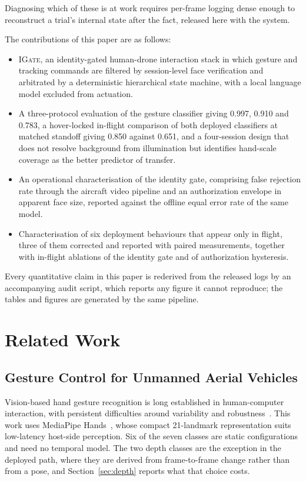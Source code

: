 \documentclass[conference]{IEEEtran}
\newcommand{\method}[1]{\textsc{#1}}
\begin{document}
Diagnosing which of these is at work requires per-frame logging dense enough to
reconstruct a trial's internal state after the fact, released here with the
system.

The contributions of this paper are as follows:

\begin{itemize}
\item \method{IGate}, an identity-gated human-drone interaction stack in which
      gesture and tracking commands are filtered by session-level face
      verification and arbitrated by a deterministic hierarchical state machine,
      with a local language model excluded from actuation.
\item A three-protocol evaluation of the gesture classifier giving 0.997, 0.910
      and 0.783, a hover-locked in-flight comparison of both deployed
      classifiers at matched standoff giving 0.850 against 0.651, and a
      four-session design that does not resolve background from illumination but
      identifies hand-scale coverage as the better predictor of transfer.
\item An operational characterisation of the identity gate, comprising false
      rejection rate through the aircraft video pipeline and an authorization
      envelope in apparent face size, reported against the offline equal error
      rate of the same model.
\item Characterisation of six deployment behaviours that appear only in flight,
      three of them corrected and reported with paired measurements, together with
      in-flight ablations of the identity gate and of authorization hysteresis.
\end{itemize}

Every quantitative claim in this paper is rederived from the released logs by an
accompanying audit script, which reports any figure it cannot reproduce; the
tables and figures are generated by the same pipeline.

\section{Related Work}
\label{sec:related}

\subsection{Gesture Control for Unmanned Aerial Vehicles}

Vision-based hand gesture recognition is long established in human-computer
interaction, with persistent difficulties around variability and
robustness~\cite{wachs2011,foteinos2025hgrreview}. This work uses MediaPipe Hands~\cite{zhang2020},
whose compact 21-landmark representation suits low-latency host-side perception.
Six of the seven classes are static configurations and need no temporal model.
The two depth classes are the exception in the deployed path, where they are
derived from frame-to-frame change rather than from a pose, and
Section~\ref{sec:depth} reports what that choice costs.
\end{document}
